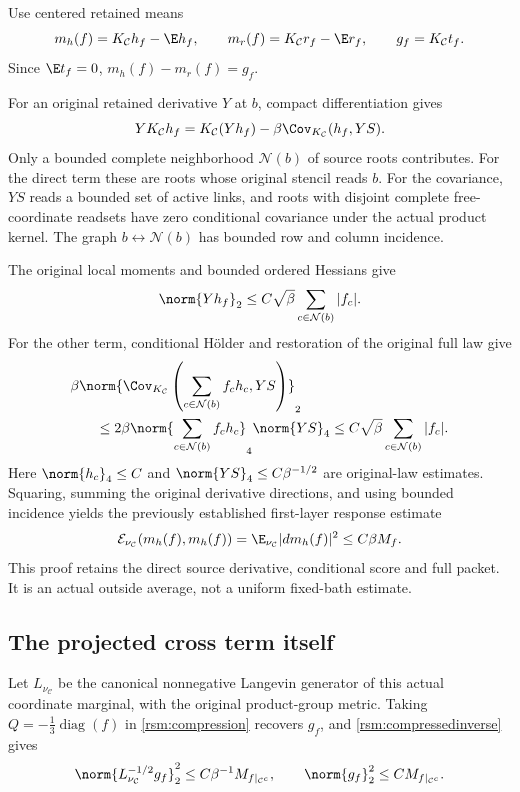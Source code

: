 Use centered retained means
\[
 m_h(f)=K_{\mathcal C}h_f-\E h_f,\qquad
 m_r(f)=K_{\mathcal C}r_f-\E r_f,\qquad
 g_f=K_{\mathcal C}t_f.
\]
Since \(\E t_f=0\), \(m_h(f)-m_r(f)=g_f\).

For an original retained derivative \(Y\) at \(b\), compact differentiation gives
\begin{equation}
 YK_{\mathcal C}h_f
 =K_{\mathcal C}(Yh_f)
       -\beta\Cov_{K_{\mathcal C}}(h_f,YS).
 \label{rsm:meanresponse}
\end{equation}
Only a bounded complete neighborhood \(\mathcal N(b)\) of source roots contributes. For the direct term these are roots whose original stencil reads \(b\). For the covariance, \(YS\) reads a bounded set of active links, and roots with disjoint complete free-coordinate readsets have zero conditional covariance under the actual product kernel. The graph \(b\leftrightarrow\mathcal N(b)\) has bounded row and column incidence.

The original local moments and bounded ordered Hessians give
\[
 \norm{Yh_f}_2\le C\sqrt\beta\sum_{c\in\mathcal N(b)}|f_c|.
\]
For the other term, conditional H\"older and restoration of the original full law give
\begin{align*}
 &\beta\norm{
 \Cov_{K_{\mathcal C}}\left(
       \sum_{c\in\mathcal N(b)}f_ch_c,YS\right)}_2\\
 &\hspace{18pt}\le
 2\beta\norm{\sum_{c\in\mathcal N(b)}f_ch_c}_4\norm{YS}_4
 \le C\sqrt\beta\sum_{c\in\mathcal N(b)}|f_c|.
\end{align*}
Here \(\norm{h_c}_4\le C\) and \(\norm{YS}_4\le C\beta^{-1/2}\) are original-law estimates. Squaring, summing the original derivative directions, and using bounded incidence yields the previously established first-layer response estimate
\begin{equation}
 {\cal E}_{\nu_{\mathcal C}}(m_h(f),m_h(f))
 =\E_{\nu_{\mathcal C}}|dm_h(f)|^2
 \le C\beta M_f.
 \label{rsm:meanenergy}
\end{equation}
This proof retains the direct source derivative, conditional score and full packet. It is an actual outside average, not a uniform fixed-bath estimate.

\subsection{The projected cross term itself}

Let \(L_{\nu_{\mathcal C}}\) be the canonical nonnegative Langevin generator of this actual coordinate marginal, with the original product-group metric. Taking \(Q=-\frac13\operatorname{diag}(f)\) in \eqref{rsm:compression} recovers \(g_f\), and \eqref{rsm:compressedinverse} gives
\[
 \norm{L_{\nu_{\mathcal C}}^{-1/2}g_f}_2^2
 \le C\beta^{-1}M_{f|_{\mathcal C^c}},
 \qquad
 \norm{g_f}_2^2\le CM_{f|_{\mathcal C^c}}.
\]


